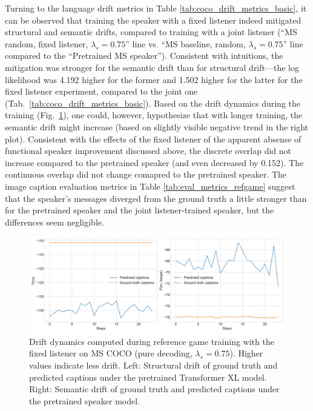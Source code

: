 Turning to the language drift metrics in Table \ref{tab:coco_drift_metrics_basic}, it can be observed that training the speaker with a fixed listener indeed mitigated structural and semantic drifts, compared to training with a joint listener (``MS random, fixed listener, $\lambda_s=0.75$'' line vs. ``MS baseline, random, $\lambda_s=0.75$'' line compared to the ``Pretrained MS speaker''). Consistent with intuitions, the mitigation was stronger for the semantic drift than for structural drift---the log likelihood was 4.192 higher for the former and 1.502 higher for the latter for the fixed listener experiment, compared to the joint one (Tab.~\ref{tab:coco_drift_metrics_basic}). Based on the drift dynamics during the training (Fig.~\ref{fig:coco_fixed_listener_075_str_sem_drift}), one could, however, hypothesize that with longer training, the semantic drift might increase (based on slightly visible negative trend in the right plot). Consistent with the effects of the fixed listener of the apparent absense of functional speaker improvement discussed above, the discrete overlap did not increase compared to the pretrained speaker (and even decreased by 0.152). The continuous overlap did not change comapred to the pretrained speaker. The image caption evaluation metrics in Table \ref{tab:eval_metrics_refgame} suggest that the speaker's messages diverged from the ground truth a little stronger than for the pretrained speaker and the joint listener-trained speaker, but the differences seem negligible. 
\begin{figure}
	\centering
	\includegraphics[width=\linewidth]{images/coco_fixedListener_structural_semantic_drift_4000_pure_075_random.png}
	\caption{Drift dynamics computed during reference game training with the fixed listener on MS COCO (pure decoding, $\lambda_s=0.75$). Higher values indicate less drift. Left: Structural drift of ground truth and predicted captions under the pretrained Transformer XL model. Right: Semantic drift of ground truth and predicted captions under the pretrained speaker model.}
	\label{fig:coco_fixed_listener_075_str_sem_drift}
\end{figure}

